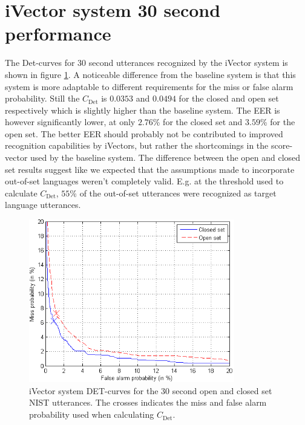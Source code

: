 
\section{iVector system 30 second performance}

The Det-curves for 30 second utterances recognized by the iVector system is shown in figure \ref{fig:ivectdet30}. A noticeable difference from the baseline system is that this system is more adaptable to different requirements for the miss or false alarm probability. Still the $C_{\text{Det}}$ is $0.0353$ and $0.0494$ for the closed and open set respectively which is slightly higher than the baseline system. The EER is however significantly lower, at only $2.76$\% for the closed set and $3.59$\% for the open set. The better EER should probably not be contributed to improved recognition capabilities by iVectors, but rather the shortcomings in the score-vector used by the baseline system. The difference between the open and closed set results suggest like we expected that the assumptions made to incorporate out-of-set languages weren't completely valid. E.g. at the threshold used to calculate $C_{\text{Det}}$, $55$\% of the out-of-set utterances were recognized as target language utterances. 

\begin{figure}[hbt!]
\begin{center}
	\includegraphics[width=0.8\textwidth]{figures/ivectDet30.png}
\end{center}
\caption{iVector system DET-curves for the 30 second open and closed set NIST utterances. The crosses indicates the miss and false alarm probability used when calculating $C_{\text{Det}}$.}
\label{fig:ivectdet30}
\end{figure}

